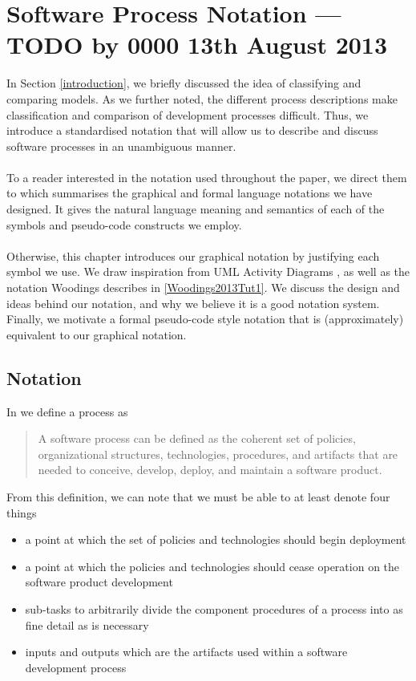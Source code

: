 \section{Software Process Notation --- TODO by 0000 13th August 2013} \label{notation}

In Section \ref{introduction}, we briefly discussed the idea of classifying and comparing models.
As we further noted, the different process descriptions make classification and comparison of
development processes difficult.
Thus, we introduce a standardised notation that will allow us to describe and discuss software
processes in an unambiguous manner.\\
\\
To a reader interested in the notation used throughout the paper, we direct them
to \FIXME which summarises the graphical and formal language notations we have
designed.
It gives the natural language meaning and semantics of each of the symbols and
pseudo-code constructs we employ.\\
\\
Otherwise, this chapter introduces our graphical notation by justifying each symbol we
use.
We draw inspiration from UML Activity Diagrams \cite{Dumas01umlactivity,BellUMLBasics}, as well as
the notation Woodings describes in \ref{Woodings2013Tut1}.
We discuss the design and ideas behind our notation, and why we believe it is a
good notation system.
Finally, we motivate a formal pseudo-code style notation that is (approximately)
  equivalent to our graphical notation.

\subsection{Notation}

In \cite{fuggetta2000software} we define a process as
\begin{quote}
A software process can be defined as the coherent set of policies, organizational structures,
	technologies, procedures, and artifacts that are needed to conceive, develop, deploy, and maintain
	a software product.
\end{quote}

From this definition, we can note that we must be able to at least denote four things
\begin{itemize}
	\item a point at which the set of policies and technologies should begin deployment
	\item a point at which the policies and technologies should cease operation on the software
	product development
	\item sub-tasks to arbitrarily divide the component procedures of a process into as fine detail as
	is necessary
	\item inputs and outputs which are the artifacts used within a software development process
\end{itemize}

